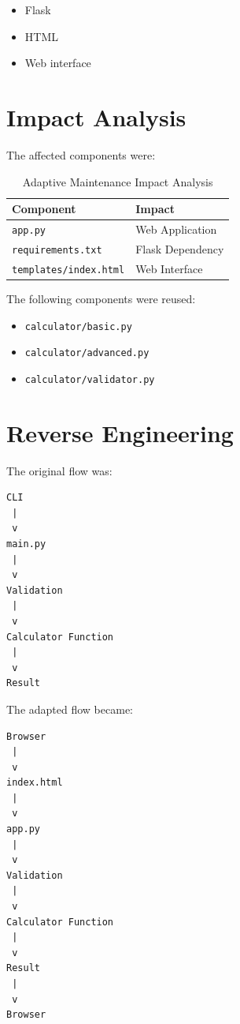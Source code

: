 \documentclass[12pt,a4paper,openany]{report}
\begin{document}
\begin{itemize}
    \item Flask
    \item HTML
    \item Web interface
\end{itemize}

\section{Impact Analysis}

The affected components were:

\begin{table}[H]
\centering
\renewcommand{\arraystretch}{1.3}
\begin{tabular}{p{5cm} p{3cm}}
\toprule
\textbf{Component} & \textbf{Impact} \\
\midrule
\texttt{app.py} & Web Application \\
\texttt{requirements.txt} & Flask Dependency \\
\texttt{templates/index.html} & Web Interface \\
\bottomrule
\end{tabular}
\caption{Adaptive Maintenance Impact Analysis}
\end{table}

The following components were reused:

\begin{itemize}
    \item \texttt{calculator/basic.py}
    \item \texttt{calculator/advanced.py}
    \item \texttt{calculator/validator.py}
\end{itemize}

\section{Reverse Engineering}

The original flow was:

\begin{verbatim}
CLI
 |
 v
main.py
 |
 v
Validation
 |
 v
Calculator Function
 |
 v
Result
\end{verbatim}

The adapted flow became:

\begin{verbatim}
Browser
 |
 v
index.html
 |
 v
app.py
 |
 v
Validation
 |
 v
Calculator Function
 |
 v
Result
 |
 v
Browser
\end{verbatim}
\end{document}
